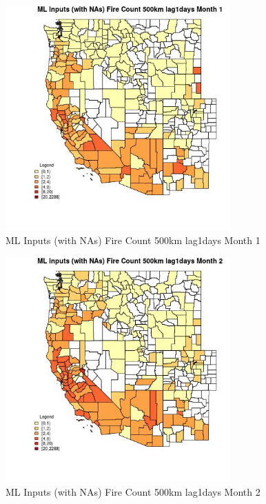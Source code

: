 \begin{figure} 
\centering  
\includegraphics[width=0.77\textwidth]{Code_Outputs/Report_ML_input_PM25_Step4_part_e_de_duplicated_aves_compiled_2019-05-20wNAs_CountyFire_Count_500km_lag1daysmedianMonth1.jpg} 
\caption{\label{fig:Report_ML_input_PM25_Step4_part_e_de_duplicated_aves_compiled_2019-05-20wNAsCountyFire_Count_500km_lag1daysmedianMonth1}ML Inputs (with NAs) Fire Count 500km lag1days Month 1} 
\end{figure} 
 

\begin{figure} 
\centering  
\includegraphics[width=0.77\textwidth]{Code_Outputs/Report_ML_input_PM25_Step4_part_e_de_duplicated_aves_compiled_2019-05-20wNAs_CountyFire_Count_500km_lag1daysmedianMonth2.jpg} 
\caption{\label{fig:Report_ML_input_PM25_Step4_part_e_de_duplicated_aves_compiled_2019-05-20wNAsCountyFire_Count_500km_lag1daysmedianMonth2}ML Inputs (with NAs) Fire Count 500km lag1days Month 2} 
\end{figure} 
 


